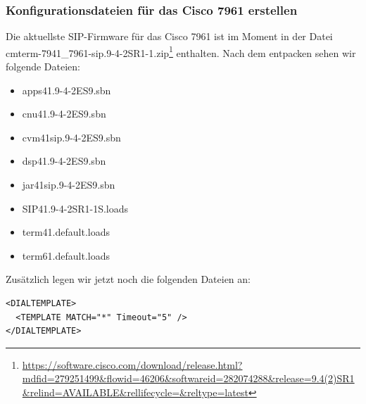 \documentclass[a4paper,12pt]{scrbook}
\begin{document}
\subsubsection{Konfigurationsdateien für das Cisco 7961 erstellen}
Die aktuellste SIP-Firmware für das Cisco 7961 ist im Moment in der Datei cmterm-7941\_7961-sip.9-4-2SR1-1.zip\footnote{\url{https://software.cisco.com/download/release.html?mdfid=279251499\&flowid=46206\&softwareid=282074288\&release=9.4(2)SR1\&relind=AVAILABLE\&rellifecycle=\&reltype=latest}} enthalten. Nach dem entpacken sehen wir folgende Dateien:

\begin{itemize}
 \item apps41.9-4-2ES9.sbn  
 \item cnu41.9-4-2ES9.sbn
 \item cvm41sip.9-4-2ES9.sbn
 \item dsp41.9-4-2ES9.sbn
 \item jar41sip.9-4-2ES9.sbn
 \item SIP41.9-4-2SR1-1S.loads
 \item term41.default.loads
 \item term61.default.loads
\end{itemize}

Zusätzlich legen wir jetzt noch die folgenden Dateien an:
\begin{lstlisting}[caption={dialplan.xml},label=lst:dialplanxml]
<DIALTEMPLATE>
  <TEMPLATE MATCH="*" Timeout="5" />
</DIALTEMPLATE>
\end{lstlisting}    
                
\end{document}
